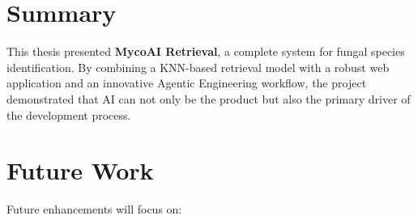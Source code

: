 \section{Summary}\label{summary-evaluation}

This thesis presented \textbf{MycoAI Retrieval}, a complete system for fungal species identification. By combining a KNN-based retrieval model with a robust web application and an innovative Agentic Engineering workflow, the project demonstrated that AI can not only be the product but also the primary driver of the development process.

\section{Future Work}\label{future-work}

Future enhancements will focus on:

